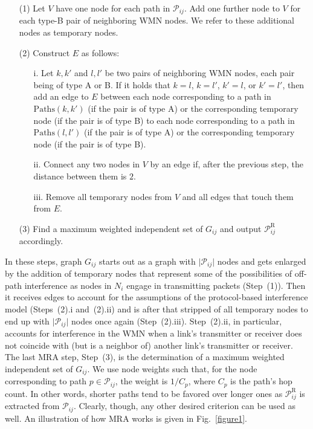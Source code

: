 \documentclass{article}
\begin{document}
\begin{enumerate}
\item[(1)] Let $V$ have one node for each path in $\mathcal{P}_{ij}$. Add one
further node to $V$ for each type-B pair of neighboring WMN nodes. We refer to
these additional nodes as temporary nodes.
\item[(2)] Construct $E$ as follows:
\begin{enumerate}
\item[i.] Let $k,k'$ and $l,l'$ be two pairs of neighboring WMN nodes, each
pair being of type A or B. If it holds that $k=l$, $k=l'$, $k'=l$, or $k'=l'$,
then add an edge to $E$ between each node corresponding to a path in
$\mathrm{Paths}(k,k')$ (if the pair is of type A) or the corresponding temporary
node (if the pair is of type B) to each node corresponding to a path in
$\mathrm{Paths}(l,l')$ (if the pair is of type A) or the corresponding temporary
node (if the pair is of type B).
\item[ii.] Connect any two nodes in $V$ by an edge if, after the previous step,
the distance between them is $2$.
\item[iii.] Remove all temporary nodes from $V$ and all edges that touch them
from $E$.
\end{enumerate}
\item[(3)] Find a maximum weighted independent set of $G_{ij}$ and output
$\mathcal{P}^\mathrm{R}_{ij}$ accordingly.
\end{enumerate}

In these steps, graph $G_{ij}$ starts out as a graph with
$\vert\mathcal{P}_{ij}\vert$ nodes and gets enlarged by the addition of
temporary nodes that represent some of the possibilities of off-path
interference as nodes in $N_i$ engage in transmitting packets (Step~(1)). Then
it receives edges to account for the assumptions of the protocol-based
interference model (Steps~(2).i and~(2).ii) and is after that stripped of all
temporary nodes to end up with $\vert\mathcal{P}_{ij}\vert$ nodes once again
(Step~(2).iii). Step~(2).ii, in particular, accounts for interference in the
WMN when a link's transmitter or receiver does not coincide with (but is a
neighbor of) another link's transmitter or receiver. The last MRA step,
Step~(3), is the determination of a maximum weighted independent set of
$G_{ij}$. We use node weights such that, for the node corresponding to path
$p\in\mathcal{P}_{ij}$, the weight is $1/C_p$, where $C_p$ is the path's hop
count. In other words, shorter paths tend to be favored over longer ones as
$\mathcal{P}^\mathrm{R}_{ij}$ is extracted from $\mathcal{P}_{ij}$. Clearly,
though, any other desired criterion can be used as well. An illustration of how
MRA works is given in Fig.~\ref{figure1}.
\end{document}
